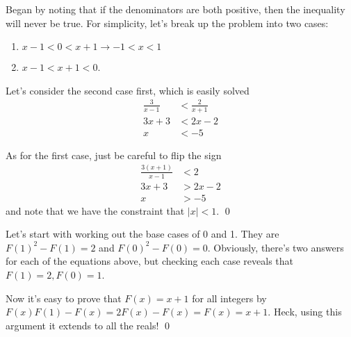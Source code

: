 \setcounter{Exercise}{3}
\begin{Exercise}
\end{Exercise}

\begin{Exercise}
	Began by noting that if the denominators are both positive, then the inequality will never be true. 
	For simplicity, let's break up the problem into two cases:
	\begin{enumerate}
		\item $x-1 < 0 < x+1 \rightarrow -1 < x < 1$
		\item $x-1 < x + 1 < 0$.
	\end{enumerate}

	Let's consider the second case first, which is easily solved
	\begin{align*}
		\frac{3}{x-1} &< \frac{2}{x+1} \\
		3x + 3 &< 2x - 2 \\
		x &< -5
	\end{align*}

	As for the first case, just be careful to flip the sign
	\begin{align*}
		\frac{3(x+1)}{x-1} &< 2 \\
		3x + 3 &> 2x - 2 \\
		x &> -5
	\end{align*}
	and note that we have the constraint that $|x| < 1$. \qed
\end{Exercise}

\begin{Exercise}
\end{Exercise}
\begin{Exercise}
\end{Exercise}

\begin{Exercise}
	Let's start with working out the base cases of 0 and 1.
	They are $F(1)^2 - F(1) = 2$ and $F(0)^2 - F(0) = 0$.
	Obviously, there's two answers for each of the equations above, but checking each case reveals that $F(1) = 2, F(0) = 1$.

	Now it's easy to prove that $F(x)=x+1$ for all integers by $F(x)F(1) - F(x) = 2F(x) - F(x) = F(x) = x + 1$.
	Heck, using this argument it extends to all the reals! \qed
\end{Exercise}